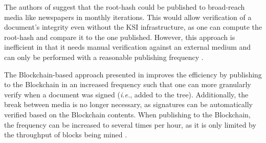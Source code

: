 The authors of \cite{hutchison_keyless_2013} suggest that the root-hash could be published to broad-reach media like newspapers in monthly iterations. This would allow verification of a document's integrity even without the KSI infrastructure, as one can compute the root-hash and compare it to the one published. However, this approach is inefficient in that it needs manual verification against an external medium and can only be performed with a reasonable publishing frequency \cite{jamthagen_blockchain-based_2016}.

The Blockchain-based approach presented in \cite{jamthagen_blockchain-based_2016} improves the efficiency by publishing to the Blockchain in an increased frequency such that one can more granularly verify when a document was signed (\textit{i.e.}, added to the tree). Additionally, the break between media is no longer necessary, as signatures can be automatically verified based on the Blockchain contents. When publishing to the Blockchain, the frequency can be increased to several times per hour, as it is only limited by the throughput of blocks being mined \cite{jamthagen_blockchain-based_2016}.
